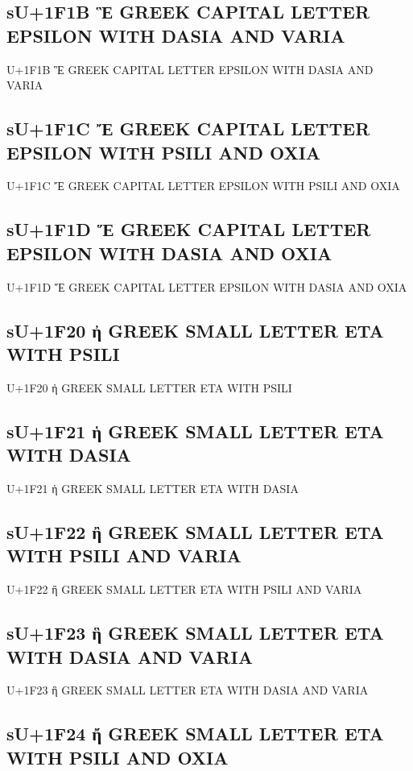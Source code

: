 \subsection{sU+1F1B Ἓ GREEK CAPITAL LETTER EPSILON WITH DASIA AND VARIA}

U+1F1B Ἓ GREEK CAPITAL LETTER EPSILON WITH DASIA AND VARIA

\subsection{sU+1F1C Ἔ GREEK CAPITAL LETTER EPSILON WITH PSILI AND OXIA}

U+1F1C Ἔ GREEK CAPITAL LETTER EPSILON WITH PSILI AND OXIA

\subsection{sU+1F1D Ἕ GREEK CAPITAL LETTER EPSILON WITH DASIA AND OXIA}

U+1F1D Ἕ GREEK CAPITAL LETTER EPSILON WITH DASIA AND OXIA

\subsection{sU+1F20 ἠ GREEK SMALL LETTER ETA WITH PSILI}

U+1F20 ἠ GREEK SMALL LETTER ETA WITH PSILI

\subsection{sU+1F21 ἡ GREEK SMALL LETTER ETA WITH DASIA}

U+1F21 ἡ GREEK SMALL LETTER ETA WITH DASIA

\subsection{sU+1F22 ἢ GREEK SMALL LETTER ETA WITH PSILI AND VARIA}

U+1F22 ἢ GREEK SMALL LETTER ETA WITH PSILI AND VARIA

\subsection{sU+1F23 ἣ GREEK SMALL LETTER ETA WITH DASIA AND VARIA}

U+1F23 ἣ GREEK SMALL LETTER ETA WITH DASIA AND VARIA

\subsection{sU+1F24 ἤ GREEK SMALL LETTER ETA WITH PSILI AND OXIA}


